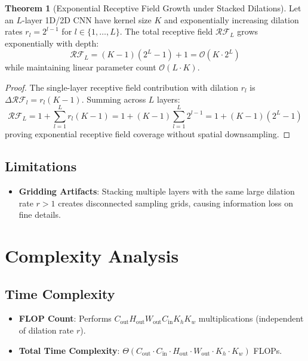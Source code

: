 \documentclass[11pt,a4paper]{article}
\theoremstyle{definition}
\newtheorem{theorem}{Theorem}[section]
\begin{document}
\begin{theorem}[Exponential Receptive Field Growth under Stacked Dilations]
Let an $L$-layer 1D/2D CNN have kernel size $K$ and exponentially increasing dilation rates $r_l = 2^{l-1}$ for $l \in \{1, \dots, L\}$. The total receptive field $\mathcal{RF}_L$ grows exponentially with depth:
\begin{equation}
\mathcal{RF}_L = (K - 1)(2^L - 1) + 1 = \mathcal{O}(K \cdot 2^L)
\end{equation}
while maintaining linear parameter count $\mathcal{O}(L \cdot K)$.
\end{theorem}

\begin{proof}
The single-layer receptive field contribution with dilation $r_l$ is $\Delta \mathcal{RF}_l = r_l(K - 1)$.
Summing across $L$ layers:
\begin{equation}
\mathcal{RF}_L = 1 + \sum_{l=1}^L r_l (K - 1) = 1 + (K - 1) \sum_{l=1}^L 2^{l-1} = 1 + (K - 1)(2^L - 1)
\end{equation}
proving exponential receptive field coverage without spatial downsampling.
\end{proof}

\subsection{Limitations}
\begin{itemize}
    \item \textbf{Gridding Artifacts}: Stacking multiple layers with the same large dilation rate $r > 1$ creates disconnected sampling grids, causing information loss on fine details.
\end{itemize}

\section{Complexity Analysis}

\subsection{Time Complexity}
\begin{itemize}
    \item \textbf{FLOP Count}: Performs $C_{\text{out}} H_{\text{out}} W_{\text{out}} C_{\text{in}} K_h K_w$ multiplications (independent of dilation rate $r$).
    \item \textbf{Total Time Complexity}: $\Theta(C_{\text{out}} \cdot C_{\text{in}} \cdot H_{\text{out}} \cdot W_{\text{out}} \cdot K_h \cdot K_w)$ FLOPs.
\end{itemize}
\end{document}
